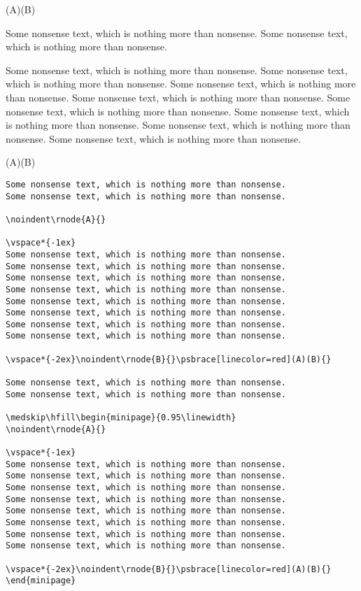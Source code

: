 \documentclass[11pt,english,BCOR10mm,DIV12,bibliography=totoc,parskip=false,smallheadings
    headexclude,footexclude,oneside]{pst-doc}
\begin{document}
\vspace*{-2ex}\noindent{}\psbrace*[linecolor=red](A)(B){}

Some nonsense text, which is nothing more than nonsense.
Some nonsense text, which is nothing more than nonsense.

\medskip\hfill\begin{minipage}{0.95\linewidth}
\noindent{}

\vspace*{-1ex}
Some nonsense text, which is nothing more than nonsense.
Some nonsense text, which is nothing more than nonsense.
Some nonsense text, which is nothing more than nonsense.
Some nonsense text, which is nothing more than nonsense.
Some nonsense text, which is nothing more than nonsense.
Some nonsense text, which is nothing more than nonsense.
Some nonsense text, which is nothing more than nonsense.
Some nonsense text, which is nothing more than nonsense.

\vspace*{-2ex}
\noindent{}\psbrace[linecolor=red](A)(B){}
\end{minipage}

\normalsize

\begin{lstlisting}
Some nonsense text, which is nothing more than nonsense.
Some nonsense text, which is nothing more than nonsense.

\noindent\rnode{A}{}

\vspace*{-1ex}
Some nonsense text, which is nothing more than nonsense.
Some nonsense text, which is nothing more than nonsense.
Some nonsense text, which is nothing more than nonsense.
Some nonsense text, which is nothing more than nonsense.
Some nonsense text, which is nothing more than nonsense.
Some nonsense text, which is nothing more than nonsense.
Some nonsense text, which is nothing more than nonsense.
Some nonsense text, which is nothing more than nonsense.

\vspace*{-2ex}\noindent\rnode{B}{}\psbrace[linecolor=red](A)(B){}

Some nonsense text, which is nothing more than nonsense.
Some nonsense text, which is nothing more than nonsense.

\medskip\hfill\begin{minipage}{0.95\linewidth}
\noindent\rnode{A}{}

\vspace*{-1ex}
Some nonsense text, which is nothing more than nonsense.
Some nonsense text, which is nothing more than nonsense.
Some nonsense text, which is nothing more than nonsense.
Some nonsense text, which is nothing more than nonsense.
Some nonsense text, which is nothing more than nonsense.
Some nonsense text, which is nothing more than nonsense.
Some nonsense text, which is nothing more than nonsense.
Some nonsense text, which is nothing more than nonsense.

\vspace*{-2ex}\noindent\rnode{B}{}\psbrace[linecolor=red](A)(B){}
\end{minipage}
\end{lstlisting}
\end{document}
